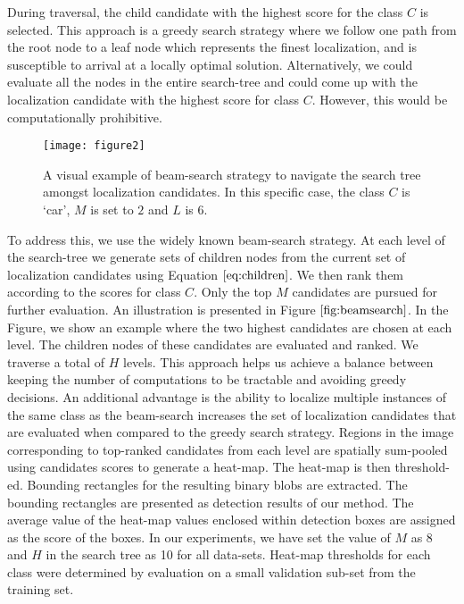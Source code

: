 \documentclass[runningheads]{llncs}
\begin{document}
During traversal, the child candidate with the highest  score for the class $C$  is selected. This approach is a greedy search strategy where we follow one path from the root node to a leaf node which represents the finest localization, and is susceptible to arrival at a locally optimal solution. Alternatively, we could evaluate all the nodes in the entire search-tree and could come up with the localization candidate with the highest score for class $C$. However, this would be computationally prohibitive.
\begin{figure*}
\begin{center}
\texttt{[image: figure2]}
\end{center}
   \caption{A visual example of beam-search strategy to navigate the search tree amongst localization candidates. In this specific case, the class $C$ is `car', $M$ is set to $2$ and $L$ is $6$.}
\label{fig:beamsearch}
\end{figure*}


To address this, we use the widely known beam-search \cite{rubin1977locus} strategy. At each level of the search-tree we generate sets of children nodes from the current set of localization candidates using Equation $\ref{eq:children}$. We then rank them according to the scores for class $C$. Only the top $M$ candidates are pursued for further evaluation. An illustration is presented in Figure $\ref{fig:beamsearch}$. In the Figure, we show an example where the two highest candidates are chosen at each level. The children nodes of these candidates are evaluated and ranked. We traverse a total of $H$ levels.  This approach helps us achieve a balance between keeping the number of computations to be tractable and avoiding greedy decisions. An additional advantage is the ability to localize multiple instances of the same class as the beam-search increases the set of localization candidates that are evaluated when compared to the greedy search strategy. Regions in the image corresponding to top-ranked candidates from each level are spatially sum-pooled using candidates scores to generate a heat-map. The heat-map is then threshold-ed. Bounding rectangles for the resulting binary blobs are extracted. The bounding rectangles are presented as detection results of our method. The average value of the heat-map values enclosed within detection boxes are assigned as the score of the boxes.
In our experiments, we have set the value of $M$ as 8 and $H$ in the search tree as 10 for all data-sets. Heat-map thresholds for each class were determined by evaluation on a small validation sub-set from the training set.
\end{document}
